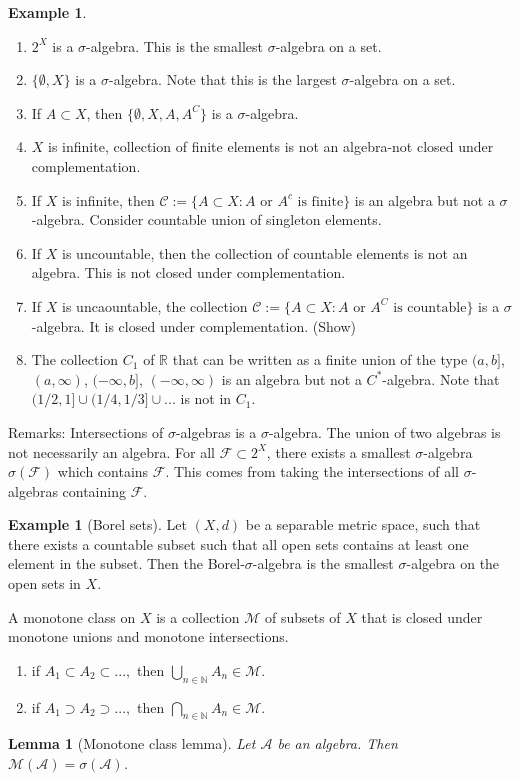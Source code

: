 \documentclass{article}
\newtheorem{lemma}[theorem]{Lemma}
\theoremstyle{definition}
\newtheorem{example}[theorem]{Example}
\numberwithin{theorem}{section}
\numberwithin{equation}{section}
\newcommand{\alg}{\mathcal{A}}
\begin{document}
\begin{example}
	\begin{enumerate}
		\item $2^X$ is a $\sigma$-algebra. This is the smallest $\sigma$-algebra on a set.
		\item $\lbrace \emptyset, X \rbrace$ is a $\sigma$-algebra. Note that this is the largest $\sigma$-algebra on a set.
		\item If $A \subset X$, then $\lbrace \emptyset, X, A, A^C \rbrace$ is a $\sigma$-algebra.
		\item $X$ is infinite, collection of finite elements is not an algebra-not closed under complementation. 
		\item If $X$ is infinite, then $\mathcal{C}:= \lbrace A \subset X : A \text{ or } A^c \text{ is finite} \rbrace$ is an algebra but not a $\sigma$-algebra. Consider countable union of singleton elements.
		\item If $X$ is uncountable, then the collection of countable elements is not an algebra. This is not closed under complementation.
		\item If $X$ is uncaountable, the collection $\mathcal{C} := \lbrace A \subset X : A \text{ or } A^C \text{ is countable} \rbrace$ is a $\sigma$-algebra. It is closed under complementation. (Show)
		\item The collection $C_1$ of $\mathbb{R}$ that can be written as a finite union of the type $(a, b]$, $(a, \infty)$, $(-\infty, b]$, $(-\infty, \infty)$ is an algebra but not a $C^*$-algebra. Note that $(1/2, 1] \cup (1/4, 1/3] \cup ...$ is not in $C_1$.
	\end{enumerate}
\end{example}

Remarks: Intersections of $\sigma$-algebras is a $\sigma$-algebra. The union of two algebras is not necessarily an algebra. For all $\mathcal{F} \subset 2^X$, there exists a smallest $\sigma$-algebra $\sigma(\mathcal{F})$ which contains $\mathcal{F}$. This comes from taking the intersections of all $\sigma$-algebras containing $\mathcal{F}$. 

\begin{example}[Borel sets]
	Let $(X, d)$ be a separable metric space, such that there exists a countable subset such that all open sets contains at least one element in the subset. Then the Borel-$\sigma$-algebra is the smallest $\sigma$-algebra on the open sets in $X$.
\end{example}

A monotone class on $X$ is a collection $\mathcal{M}$ of subsets of $X$ that is closed under monotone unions and monotone intersections.
\begin{enumerate}
	\item if $A_1 \subset A_2 \subset ..., $ then $\bigcup_{n \in \mathbb{N}} A_n \in \mathcal{M}$.
	\item if $A_1 \supset A_2 \supset ..., $ then $\bigcap_{n \in \mathbb{N}} A_n \in \mathcal{M}$.
\end{enumerate}
\begin{lemma}[Monotone class lemma]
	Let $\alg$ be an algebra. Then $\mathcal{M}(\alg) = \sigma(\alg)$.
\end{lemma}
\end{document}
